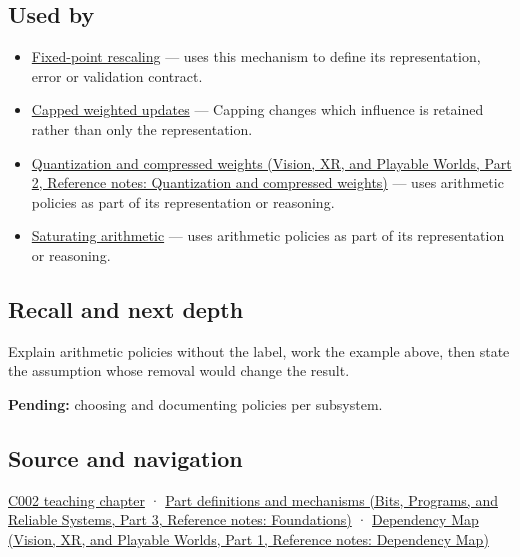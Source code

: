 \subsection{Used by}\label{appendix-2ed044358b82-used-by}

\hypertarget{appendix-2ed044358b82-used-by}{}

\begin{itemize}
\item
  \hyperref[appendix-3333db47830f]{Fixed-point rescaling} --- uses this mechanism to define its representation, error or validation contract.
\item
  \hyperref[appendix-1e45d0613db3]{Capped weighted updates} --- Capping changes which influence is retained rather than only the representation.
\item
  \href{../07-Vision-XR-and-Playable-Worlds-P02/main.pdf\#appendix-fdc7879e8bf2}{Quantization and compressed weights (Vision, XR, and Playable Worlds, Part 2, Reference notes: Quantization and compressed weights)} --- uses arithmetic policies as part of its representation or reasoning.
\item
  \hyperref[appendix-3999c6209649]{Saturating arithmetic} --- uses arithmetic policies as part of its representation or reasoning.
\end{itemize}

\subsection{Recall and next depth}\label{appendix-2ed044358b82-recall-and-next-depth}

\hypertarget{appendix-2ed044358b82-recall-and-next-depth}{}

Explain arithmetic policies without the label, work the example above, then state the assumption whose removal would change the result.

\textbf{Pending:} choosing and documenting policies per subsystem.

\subsection{Source and navigation}\label{appendix-2ed044358b82-source-and-navigation}

\hypertarget{appendix-2ed044358b82-source-and-navigation}{}

\hyperref[01-foundations-i-ch001-arithmetic-becomes-a-policy]{C002 teaching chapter} · \href{../01-Bits-Programs-and-Reliable-Systems-P03/main.pdf\#appendix-fd090d982a15}{Part definitions and mechanisms (Bits, Programs, and Reliable Systems, Part 3, Reference notes: Foundations)} · \href{../07-Vision-XR-and-Playable-Worlds-P01/main.pdf\#appendix-4ad47bdd269a}{Dependency Map (Vision, XR, and Playable Worlds, Part 1, Reference notes: Dependency Map)}
